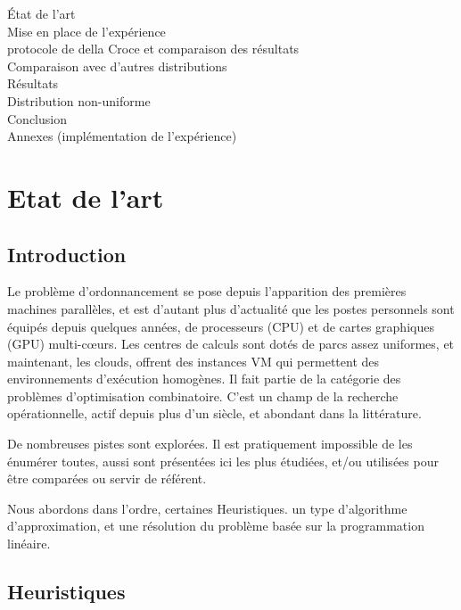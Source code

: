 \documentclass[a4paper,12pt]{report}
\theoremstyle{plain}				%
\theoremstyle{definition}				%
\newcommand{\fco}[1]{\todo[author=FCO,color=teal,inline]{#1}}
\begin{document}
\bigskip
\fco{...Plan une fois terminé...}
État de l'art\\
Mise en place de l'expérience\\
protocole de della Croce et comparaison des résultats\\
Comparaison avec d'autres distributions\\
Résultats\\
Distribution non-uniforme\\
Conclusion \\
Annexes (implémentation de l'expérience)

\section{Etat de l'art} \label{sec:etatDeLArt}

\subsection{Introduction} \label{ssec:etatDeLArtIntroduction}

Le problème d'ordonnancement se pose depuis l'apparition des premières machines parallèles, et 
  est d'autant plus d'actualité que les postes personnels sont équipés depuis quelques années, 
  de processeurs (CPU) et de cartes graphiques (GPU) multi-c{\oe}urs.
Les centres de calculs sont dotés de parcs assez uniformes, et maintenant, 
  les clouds, offrent des instances VM qui permettent des environnements 
  d'exécution homogènes.     
Il fait partie de la catégorie des problèmes d'optimisation combinatoire. 
C'est un champ de la recherche opérationnelle, actif depuis plus d'un siècle, 
  et abondant dans la littérature. 

De nombreuses pistes sont explorées. Il est pratiquement impossible de les énumérer toutes, 
  aussi sont présentées ici les plus étudiées, 
  et/ou utilisées pour être comparées ou servir de référent.
  
Nous abordons dans l'ordre, certaines Heuristiques. un type d'algorithme d'approximation, et une résolution du problème basée sur la programmation linéaire.

\subsection{Heuristiques}\label{ssec:Heuristiques}
\end{document}
